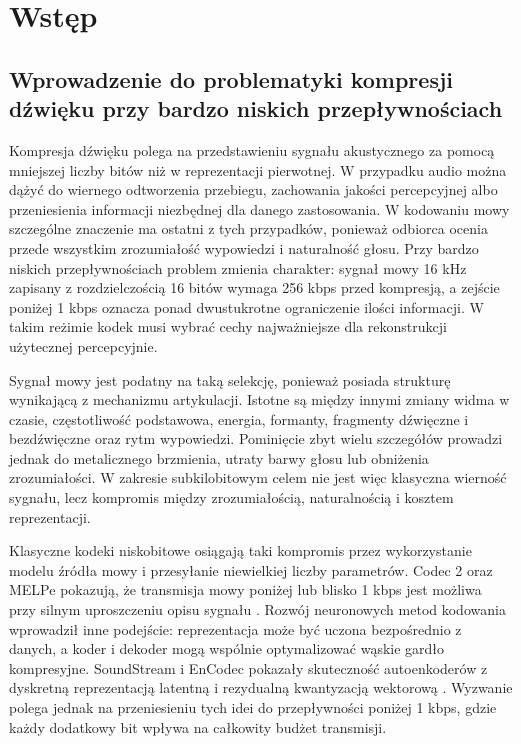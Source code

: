 \chapter{Wstęp}
\label{ch:wstep}

\section{Wprowadzenie do problematyki kompresji dźwięku przy bardzo niskich przepływnościach}
\label{sec:wprowadzenie-kompresja-ultra-low}

Kompresja dźwięku polega na przedstawieniu sygnału akustycznego za pomocą mniejszej liczby bitów niż w reprezentacji pierwotnej. W przypadku audio można dążyć do wiernego odtworzenia przebiegu, zachowania jakości percepcyjnej albo przeniesienia informacji niezbędnej dla danego zastosowania. W kodowaniu mowy szczególne znaczenie ma ostatni z tych przypadków, ponieważ odbiorca ocenia przede wszystkim zrozumiałość wypowiedzi i naturalność głosu. Przy bardzo niskich przepływnościach problem zmienia charakter: sygnał mowy 16 kHz zapisany z rozdzielczością 16 bitów wymaga 256 kbps przed kompresją, a zejście poniżej 1 kbps oznacza ponad dwustukrotne ograniczenie ilości informacji. W takim reżimie kodek musi wybrać cechy najważniejsze dla rekonstrukcji użytecznej percepcyjnie.

Sygnał mowy jest podatny na taką selekcję, ponieważ posiada strukturę wynikającą z mechanizmu artykulacji. Istotne są między innymi zmiany widma w czasie, częstotliwość podstawowa, energia, formanty, fragmenty dźwięczne i bezdźwięczne oraz rytm wypowiedzi. Pominięcie zbyt wielu szczegółów prowadzi jednak do metalicznego brzmienia, utraty barwy głosu lub obniżenia zrozumiałości. W zakresie subkilobitowym celem nie jest więc klasyczna wierność sygnału, lecz kompromis między zrozumiałością, naturalnością i kosztem reprezentacji.

Klasyczne kodeki niskobitowe osiągają taki kompromis przez wykorzystanie modelu źródła mowy i przesyłanie niewielkiej liczby parametrów. Codec 2 oraz MELPe pokazują, że transmisja mowy poniżej lub blisko 1 kbps jest możliwa przy silnym uproszczeniu opisu sygnału \cite{Rowe2019Codec2,Rowe2021Codec2450,NATO2015STANAG4591}. Rozwój neuronowych metod kodowania wprowadził inne podejście: reprezentacja może być uczona bezpośrednio z danych, a koder i dekoder mogą wspólnie optymalizować wąskie gardło kompresyjne. SoundStream i EnCodec pokazały skuteczność autoenkoderów z dyskretną reprezentacją latentną i rezydualną kwantyzacją wektorową \cite{Zeghidour2021SoundStream,Defossez2022Encodec}. Wyzwanie polega jednak na przeniesieniu tych idei do przepływności poniżej 1 kbps, gdzie każdy dodatkowy bit wpływa na całkowity budżet transmisji.

